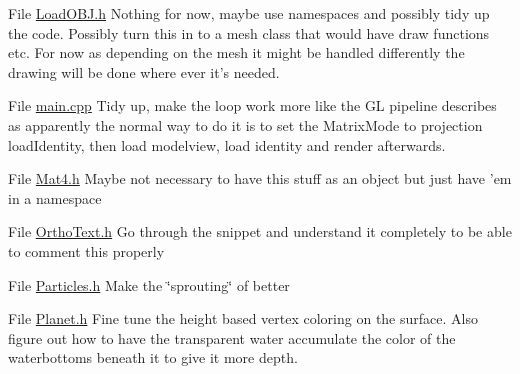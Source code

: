 \begin{DoxyDescription}
\item[File \hyperlink{LoadOBJ_8h}{LoadOBJ.h} ]Nothing for now, maybe use namespaces and possibly tidy up the code. Possibly turn this in to a mesh class that would have draw functions etc. For now as depending on the mesh it might be handled differently the drawing will be done where ever it's needed. 
\end{DoxyDescription}

\label{todo__todo000018}
\hypertarget{todo__todo000018}{}
 
\begin{DoxyDescription}
\item[File \hyperlink{main_8cpp}{main.cpp} ]Tidy up, make the loop work more like the GL pipeline describes as apparently the normal way to do it is to set the MatrixMode to projection loadIdentity, then load modelview, load identity and render afterwards. 
\end{DoxyDescription}

\label{todo__todo000008}
\hypertarget{todo__todo000008}{}
 
\begin{DoxyDescription}
\item[File \hyperlink{Mat4_8h}{Mat4.h} ]Maybe not necessary to have this stuff as an object but just have 'em in a namespace 
\end{DoxyDescription}

\label{todo__todo000010}
\hypertarget{todo__todo000010}{}
 
\begin{DoxyDescription}
\item[File \hyperlink{OrthoText_8h}{OrthoText.h} ]Go through the snippet and understand it completely to be able to comment this properly 
\end{DoxyDescription}

\label{todo__todo000011}
\hypertarget{todo__todo000011}{}
 
\begin{DoxyDescription}
\item[File \hyperlink{Particles_8h}{Particles.h} ]Make the \char`\"{}sprouting\char`\"{} of better 
\end{DoxyDescription}

\label{todo__todo000012}
\hypertarget{todo__todo000012}{}
 
\begin{DoxyDescription}
\item[File \hyperlink{Planet_8h}{Planet.h} ]Fine tune the height based vertex coloring on the surface. Also figure out how to have the transparent water accumulate the color of the waterbottoms beneath it to give it more depth. 
\end{DoxyDescription}

